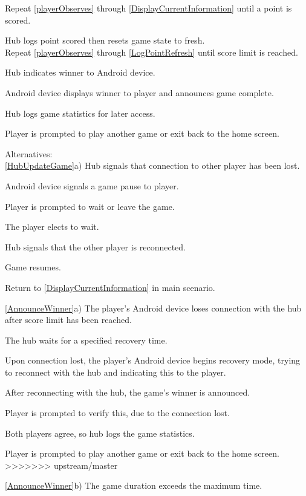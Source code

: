 \documentclass[12pt]{article}
\newenvironment{itemize*}%
  {\begin{itemize}%
  	\setlength{\parsep}{0pt}
    \setlength{\itemsep}{0pt}%
    \setlength{\parskip}{0pt}}%
  {\end{itemize}}
\newenvironment{enumerate*}%
  {\begin{enumerate}%
  	\setlength{\parsep}{0pt}
    \setlength{\itemsep}{0pt}%
    \setlength{\parskip}{0pt}}%
  {\end{enumerate}}
\begin{document}
\begin{itemize*}
\begin{enumerate*}
Repeat \ref{playerObserves} through \ref{DisplayCurrentInformation} until a point is scored.
\item \label{LogPointRefresh}Hub logs point scored then resets game state to fresh.\\
Repeat \ref{playerObserves} through \ref{LogPointRefresh} until score limit is reached.
\item \label{AnnounceWinner}Hub indicates winner to Android device.
\item Android device displays winner to player and announces game complete.
\item Hub logs game statistics for later access.
\item Player is prompted to play another game or exit back to the home screen.
\end{enumerate*}
Alternatives:\\
\ref{HubUpdateGame}a) Hub signals that connection to other player has been lost.
\begin{enumerate*}
\item Android device signals a game pause to player.
\item Player is prompted to wait or leave the game.
\item The player elects to wait.
\item Hub signals that the other player is reconnected.
\item Game resumes.
\item Return to \ref{DisplayCurrentInformation} in main scenario.
\end{enumerate*}
\ref{AnnounceWinner}a) The player's Android device loses connection with the hub after score limit has been reached.
\begin{enumerate*}
\item The hub waits for a specified recovery time.
\item Upon connection lost, the player's Android device begins recovery mode, trying to reconnect with the hub and indicating this to the player.
\item After reconnecting with the hub, the game's winner is announced.  
\item Player is prompted to verify this, due to the connection lost. 
\item Both players agree, so hub logs the game statistics.
\item Player is prompted to play another game or exit back to the home screen.
>>>>>>> upstream/master
\end{enumerate*}
\ref{AnnounceWinner}b) The game duration exceeds the maximum time.

\end{itemize*}
\end{document}
